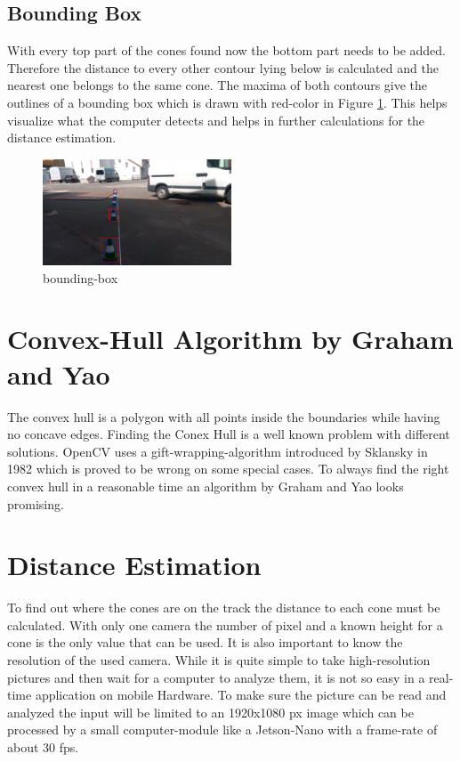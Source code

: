 \documentclass[10pt,a4paper]{article}
\begin{document}
	
	\subsection{Bounding Box}
	With every top part of the cones found now the bottom part needs to be added. Therefore the distance to every other contour lying below is calculated and the nearest one belongs to the same cone.
	The maxima of both contours give the outlines of a bounding box which is drawn with red-color in Figure \ref{bounding-box}. This helps visualize what the computer detects and helps in further calculations for the distance estimation.
	
	\begin{figure}[h]
		\centering
		\includegraphics[width=0.5\textwidth]{Abb/bounding-box.png}
		\caption{bounding-box}
		\label{bounding-box}
	\end{figure}
	
	\section{Convex-Hull Algorithm by Graham and Yao} \label{convex-hull}
	The convex hull is a polygon with all points inside the boundaries while having no concave edges. Finding the Conex Hull is a well known problem with different solutions. OpenCV uses a gift-wrapping-algorithm introduced by Sklansky in 1982 \cite{opencv-doku} which is proved to be wrong on some special cases\cite{history-of-convex-hull}. To always find the right convex hull in a reasonable time an algorithm by Graham and Yao looks promising.
	
	
	
	\section{Distance Estimation}
	To find out where the cones are on the track the distance to each cone must be calculated. 
	With only one camera the number of pixel and a known height for a cone is the only value that can be used. It is also important to know the resolution of the used camera.
	While it is quite simple to take high-resolution pictures and then wait for a computer to analyze them, it is not so easy in a real-time application on mobile Hardware. To make sure the picture can be read and analyzed the input will be limited to an 1920x1080 px image which can be processed by a small computer-module like a Jetson-Nano with a frame-rate of about 30 fps.
\end{document}
